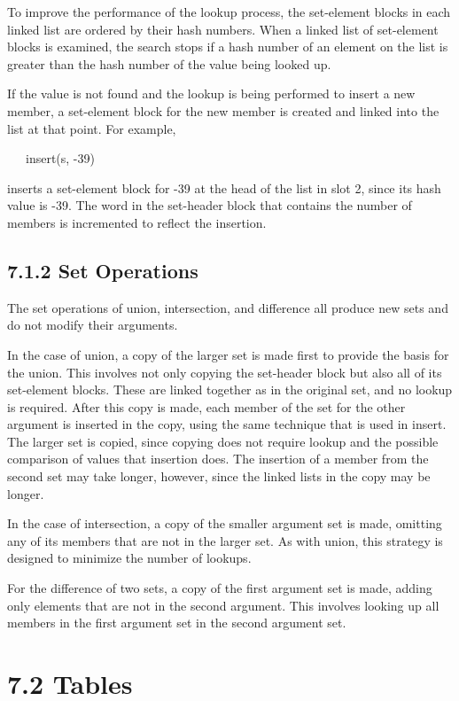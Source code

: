 To improve the performance of the lookup process, the set-element
blocks in each linked list are ordered by their hash numbers. When a
linked list of set-element blocks is examined, the search stops if a
hash number of an element on the list is greater than the hash number
of the value being looked up.

If the value is not found and the lookup is being performed to insert
a new member, a set-element block for the new member is created and
linked into the list at that point. For example,

{\ttfamily\mdseries
\ \ \ insert(s, -39)}

\noindent inserts a set-element block for -39 at the head of the list
in slot 2, since its hash value is -39. The word in the set-header
block that contains the number of members is incremented to reflect
the insertion.

\subsection[7.1.2 Set Operations]{7.1.2 Set Operations}

The set operations of union, intersection, and difference all produce
new sets and do not modify their arguments.


In the case of union, a copy of the larger set is made first to
provide the basis for the union. This involves not only copying the
set-header block but also all of its set-element blocks. These are
linked together as in the original set, and no lookup is
required. After this copy is made, each member of the set for the
other argument is inserted in the copy, using the same technique that
is used in insert. The larger set is copied, since copying does not
require lookup and the possible comparison of values that insertion
does. The insertion of a member from the second set may take longer,
however, since the linked lists in the copy may be longer.

In the case of intersection, a copy of the smaller argument set is
made, omitting any of its members that are not in the larger set. As
with union, this strategy is designed to minimize the number of
lookups.

For the difference of two sets, a copy of the first argument set is
made, adding only elements that are not in the second argument. This
involves looking up all members in the first argument set in the
second argument set.

\section[7.2 Tables]{7.2 Tables}

